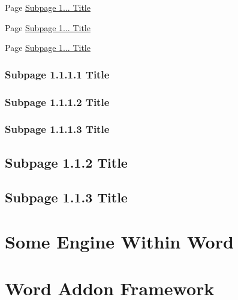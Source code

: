 \begin{DoxyItemize}
\item Page \hyperlink{subpage_1_1_1_1}{Subpage 1... Title}
\item Page \hyperlink{subpage_1_1_1_2}{Subpage 1... Title}
\item Page \hyperlink{subpage_1_1_1_3}{Subpage 1... Title} 
\end{DoxyItemize}\hypertarget{subpage_1_1_1_1}{}\subsubsection{Subpage 1.1.1.1 Title}\label{subpage_1_1_1_1}
\hypertarget{subpage_1_1_1_2}{}\subsubsection{Subpage 1.1.1.2 Title}\label{subpage_1_1_1_2}
\hypertarget{subpage_1_1_1_3}{}\subsubsection{Subpage 1.1.1.3 Title}\label{subpage_1_1_1_3}
\hypertarget{subpage_1_1_2}{}\subsection{Subpage 1.1.2 Title}\label{subpage_1_1_2}
\hypertarget{subpage_1_1_3}{}\subsection{Subpage 1.1.3 Title}\label{subpage_1_1_3}
\hypertarget{subpage_1_2}{}\section{Some Engine Within Word}\label{subpage_1_2}
\hypertarget{subpage_1_3}{}\section{Word Addon Framework}\label{subpage_1_3}
